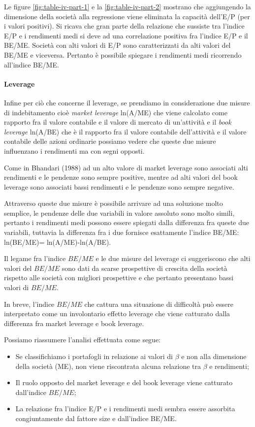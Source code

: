 Le figure \ref{fig:table-iv-part-1} e la \ref{fig:table-iv-part-2} mostrano che aggiungendo la dimensione della società alla regressione viene eliminata la capacità dell'E/P (per i valori positivi). Si ricava che gran parte della relazione che sussiste tra l'indice E/P e i rendimenti medi si deve ad una correlazione positiva fra l'indice E/P e il BE/ME. Società con alti valori di E/P sono caratterizzati da alti valori del BE/ME e viceversa. Pertanto è possibile spiegare i rendimenti medi ricorrendo all'indice BE/ME.

\paragraph{Leverage}Infine per ciò che concerne il leverage, se prendiamo in considerazione due misure di indebitamento cioè \textit{market leverage} ln(A/ME) che viene calcolato come rapporto fra il valore contabile e il valore di mercato di un'attività e il \textit{book leverage} ln(A/BE) che è il rapporto fra il valore contabile dell'attività e il valore contabile delle azioni ordinarie possiamo vedere che queste due misure influenzano i rendimenti ma con segni opposti. 

Come in Bhandari (1988) ad un alto valore di market leverage sono associati alti rendimenti e le pendenze sono sempre positive, mentre ad alti valori del book leverage sono associati bassi rendimenti e le pendenze sono sempre negative. 

Attraverso queste due misure è possibile arrivare ad una soluzione molto semplice, le pendenze delle due variabili in valore assoluto sono molto simili, pertanto i rendimenti medi possono essere spiegati dalla differenza fra queste due variabili, tuttavia la differenza fra i due fornisce esattamente l'indice BE/ME: ln(BE/ME)= ln(A/ME)-ln(A/BE). 

Il legame fra l'indice $BE/ME$ e le due misure del leverage ci suggeriscono che alti valori del $BE/ME$ sono dati da scarse prospettive di crescita della società  rispetto alle società con migliori prospettive e che pertanto presentano bassi valori di $BE/ME$.

In breve, l'indice $BE/ME$ che cattura una situazione di difficoltà può essere interpretato come un involontario effetto leverage che viene catturato dalla differenza fra market leverage e book leverage.  

Possiamo riassumere l'analisi effettuata come segue:
\begin{itemize}
	\item Se classifichiamo i portafogli in relazione ai valori di $\beta$ e non alla dimensione della società (ME), non viene riscontrata alcuna relazione tra $\beta$ e rendimenti;
	\item Il ruolo opposto del market leverage e del book leverage viene catturato dall'indice $BE/ME$;
	\item La relazione fra l'indice E/P e i rendimenti medi sembra essere assorbita congiuntamente dal fattore size e dall'indice BE/ME.  
\end{itemize}

